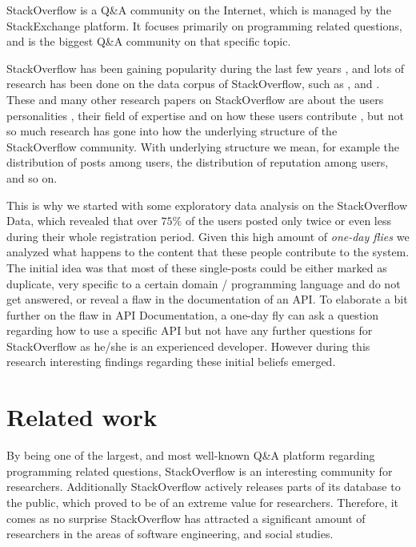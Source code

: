 \documentclass[conference]{IEEEtran}
\begin{document}
StackOverflow is a Q\&A community on the Internet, which is managed by the
StackExchange platform. It focuses primarily on programming related questions,
and is the biggest Q\&A community on that specific topic.

StackOverflow has been gaining popularity during the last few years
\cite{anderson2012discovering}, and lots of research has been done on the data
corpus of StackOverflow, such as \cite{treude2011programmers},
\cite{barua2014developers} and \cite{morrison2013age}. These and many other
research papers on StackOverflow are about the users personalities
\cite{bosu2013building}, their field of expertise and on how these users
contribute \cite{movshovitz2013analysis}, but not so much research has gone
into how the underlying structure of the StackOverflow community. With
underlying structure we mean, for example the distribution of posts among
users, the distribution of reputation among users, and so on.

This is why we started with some exploratory data analysis on the StackOverflow
Data, which revealed that over $75\%$ of the users posted only twice or even
less during their whole registration period. Given this high amount of
\textit{one-day flies} we analyzed what happens to the content that these
people contribute to the system. The initial idea was that most of these
single-posts could be either marked as duplicate, very specific to a certain
domain / programming language and do not get answered, or reveal a flaw in the
documentation of an API. To elaborate a bit further on the flaw in API
Documentation, a one-day fly can ask a question regarding how to use a specific
API but not have any further questions for StackOverflow as he/she is an
experienced developer. However during this research interesting findings
regarding these initial beliefs emerged.


\section{Related work}

By being one of the largest, and most well-known Q\&A platform regarding
programming related questions, StackOverflow is an interesting community for
researchers. Additionally StackOverflow actively releases parts of its database
to the public, which proved to be of an extreme value for researchers.
Therefore, it comes as no surprise StackOverflow has attracted a significant
amount of researchers in the areas of software engineering, and social studies.
\end{document}
